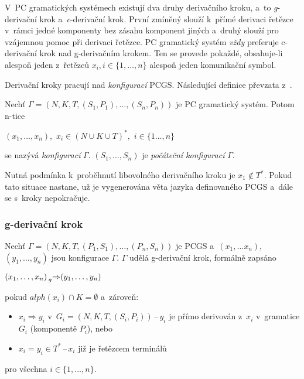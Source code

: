 V~PC gramatických systémech existují dva druhy derivačního kroku, a~to \emph{g}-derivační krok a~\emph{c}-derivační krok.
První zmíněný slouží k~přímé derivaci řetězce v~rámci jedné komponenty bez zásahu komponent jiných a~druhý slouží pro vzájemnou pomoc při derivaci řetězce. 
PC gramatický systém \emph{vždy} preferuje c-derivační krok nad g-derivačním krokem.
Ten se provede pokaždé, obsahuje-li alespoň jeden z~řetězců $x_i, i \in \{1, \ldots, n\}$ alespoň jeden komunikační symbol.

Derivační kroky pracují nad \emph{konfigurací} PCGS.
Následující definice převzata z~\cite{Various-communications-in-PC-grammar-systems}.
\begin{definition}
    Nechť $\Gamma = (N, K, T, (S_1, P_1), \ldots, (S_n, P_n))$ je PC gramatický systém.
    Potom n-tice
    \begin{center}
        $(x_1, \ldots, x_n),$ $x_i \in (N \cup K \cup T)^*,$ $i \in \{1 \ldots, n\}$
    \end{center}
    se nazývá \emph{konfigurací} $\Gamma$. $(S_1, \ldots, S_n)$ je \emph{počáteční konfigurací} $\Gamma$.
\end{definition}
Nutná podmínka k~proběhnutí libovolného derivačního kroku je $x_1 \notin T^*$.
Pokud tato situace nastane, už je vygenerována věta jazyka definovaného PCGS a~dále se s~kroky nepokračuje. 

\subsubsection*{g-derivační krok}\label{kap_g_der_krok}
Nechť $\Gamma = (N, K, T, (P_1, S_1), \ldots, (P_n, S_n))$ je PCGS a~$(x_1, \ldots x_n),$ $(y_1, \ldots, y_n)$ jsou konfigurace $\Gamma$.
$\Gamma$ udělá g-derivační krok, formálně zapsáno
\begin{center}
    $(x_1, \ldots, x_n) \prescript{}{g}{\Rightarrow} (y_1, \ldots, y_n)$
\end{center}
pokud $alph(x_i) \cap K = \emptyset$ a~zároveň:
\begin{itemize}
    \item $x_i \Rightarrow y_i$ v~$G_i = (N, K, T, (S_i, P_i))$\,--\,$y_i$ je přímo derivován z~$x_i$ v~gramatice $G_i$ (komponentě $P_i$), nebo
    \item $x_i = y_i \in T^*$\,--\,$x_i$ již je řetězcem terminálů
\end{itemize}   
pro všechna $i \in \{1, \ldots, n\}$.

